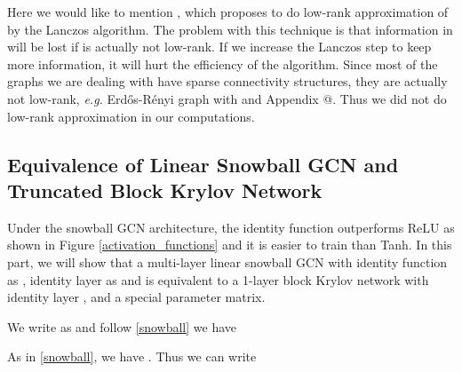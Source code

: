 \documentclass{article}
\makeatletter
\newcommand\eg{\textit{e.g.}}
\newcommand*{\rom}[1]{\expandafter\@slowromancap\romannumeral #1@}
\makeatother
\begin{document}
Here we would like to mention \cite{liao2019lanczos}, which proposes to do low-rank approximation of  by the Lanczos algorithm. The problem with this technique is that information in  will be lost if  is actually not low-rank. If we increase the Lanczos step to keep more information, it will hurt the efficiency of the algorithm. Since most of the graphs we are dealing with have sparse connectivity structures, they are actually not low-rank, \eg{} Erd\H{o}s-R\'enyi graph  with  \cite{tran2013sparse} and Appendix \rom{4}.
Thus we did not do low-rank approximation in our computations.


\subsection{Equivalence of Linear Snowball GCN and Truncated Block Krylov Network}
\label{linear_snowball}


Under the snowball GCN architecture, the identity function outperforms ReLU as shown in Figure \ref{activation_functions} and it is easier to train than Tanh. In this part, we will show that a multi-layer linear snowball GCN with identity function as , identity layer as  and  is equivalent to a 1-layer block Krylov network with identity layer ,  and a special parameter matrix.

We write  as  and follow \eqref{snowball} we have

As in \eqref{snowball}, we have . Thus we can write
\iffalse
\end{document}

